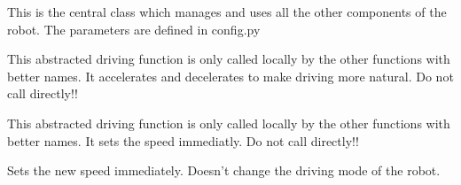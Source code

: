\documentclass[letterpaper,10pt,english]{sphinxmanual}
\begin{document}
\begin{fulllineitems}
\label{\detokenize{autoapi/robotlibrary/robot/index:robotlibrary.robot.Robot}}
\pysigstartsignatures
{}
\pysigstopsignatures
\sphinxAtStartPar
This is the central class which manages and uses all the other components of the robot. The parameters are defined in config.py

\begin{fulllineitems}
\label{\detokenize{autoapi/robotlibrary/robot/index:robotlibrary.robot.Robot._drive}}
\pysigstartsignatures
{}
\pysigstopsignatures
\sphinxAtStartPar
This abstracted driving function is only called locally by the other functions with better names.
It accelerates and decelerates to make driving more natural. Do not call directly!!

\end{fulllineitems}


\begin{fulllineitems}
\label{\detokenize{autoapi/robotlibrary/robot/index:robotlibrary.robot.Robot._drive_instantly}}
\pysigstartsignatures
{}
\pysigstopsignatures
\sphinxAtStartPar
This abstracted driving function is only called locally by the other functions with better names.
It sets the speed immediatly. Do not call directly!!

\end{fulllineitems}


\begin{fulllineitems}
\label{\detokenize{autoapi/robotlibrary/robot/index:robotlibrary.robot.Robot.set_speed_instantly}}
\pysigstartsignatures
{}
\pysigstopsignatures
\sphinxAtStartPar
Sets the new speed immediately. Doesn’t change the driving mode of the robot.


\end{fulllineitems}
\end{fulllineitems}
\end{document}
